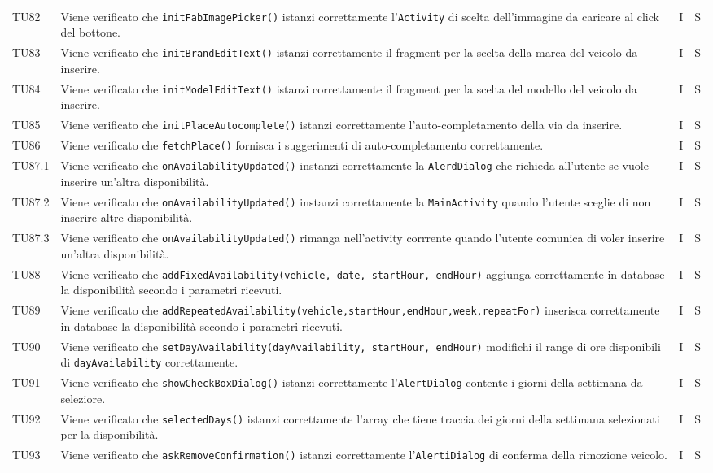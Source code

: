 \begin{longtable}{ >{\centering}p{}  >{\centering}p{} >{\centering}p{}
			>{\centering}p{}}
		\tabularnewline	
		TU82 & Viene verificato che \texttt{initFabImagePicker()} istanzi correttamente l'\texttt{Activity} di scelta dell'immagine da caricare al click del bottone. & I & S
		\tabularnewline	
		TU83 & Viene verificato che \texttt{initBrandEditText()} istanzi correttamente il fragment per la scelta della marca del veicolo da inserire. & I & S
		\tabularnewline	
		TU84 & Viene verificato che \texttt{initModelEditText()} istanzi correttamente il fragment per la scelta del modello del veicolo da inserire. & I & S
		\tabularnewline	
		TU85 & Viene verificato che \texttt{initPlaceAutocomplete()} istanzi correttamente l'auto-completamento della via da inserire. & I & S
		\tabularnewline	
		TU86 & Viene verificato che \texttt{fetchPlace()} fornisca i suggerimenti di auto-completamento correttamente. & I & S
		\tabularnewline	
		TU87.1 & Viene verificato che \texttt{onAvailabilityUpdated()} instanzi correttamente la \texttt{AlerdDialog} che richieda all'utente se vuole inserire un'altra disponibilità. & I & S
		\tabularnewline	
		TU87.2 & Viene verificato che \texttt{onAvailabilityUpdated()} instanzi correttamente la \texttt{MainActivity} quando l'utente sceglie di non inserire altre disponibilità. & I & S
		\tabularnewline	
		TU87.3 & Viene verificato che \texttt{onAvailabilityUpdated()} rimanga nell'activity corrrente quando l'utente comunica di voler inserire un'altra disponibilità. & I & S
		\tabularnewline	
		TU88 & Viene verificato che \texttt{addFixedAvailability(vehicle, date, startHour, endHour)} aggiunga correttamente in database la disponibilità secondo i parametri ricevuti. & I & S
		\tabularnewline	
		TU89 & Viene verificato che \texttt{addRepeatedAvailability(vehicle,startHour,endHour,week,repeatFor)} inserisca correttamente in database la disponibilità secondo i parametri ricevuti. & I & S
		\tabularnewline	
		TU90 & Viene verificato che \texttt{setDayAvailability(dayAvailability, startHour, endHour)} modifichi il range di ore disponibili di \texttt{dayAvailability} correttamente. & I & S
		\tabularnewline	
		TU91 & Viene verificato che \texttt{showCheckBoxDialog()} istanzi correttamente l'\texttt{AlertDialog} contente i giorni della settimana da seleziore. & I & S
		\tabularnewline	
		TU92 & Viene verificato che \texttt{selectedDays()} istanzi correttamente l'array che tiene traccia dei giorni della settimana selezionati per la disponibilità. & I & S
		\tabularnewline	
		TU93 & Viene verificato che \texttt{askRemoveConfirmation()} istanzi correttamente l'\texttt{AlertiDialog} di conferma della rimozione veicolo. & I & S
		\tabularnewline	

\end{longtable}
